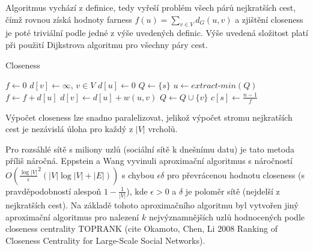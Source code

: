 \documentclass{bakalarka}
\begin{document}
Algoritmus vychází z definice, tedy vyřeší problém všech párů nejkratších cest,
čímž rovnou získá hodnoty farness $f(u) = \sum_{v \in V} d_G(u, v)$ a zjištění
closeness je poté triviální podle jedné z výše uvedených definic.  Výše uvedená
složitost platí při použití Dijkstrova algoritmu pro všechny páry cest.

\begin{center}
\begin{minipage}{\textwidth}
\begin{algorithm}[H]
	\caption{Closeness}
		\label{alg:closeness}

	\begin{algorithmic}[1]
	\Statex
		\State $f \gets 0$
		\State $d[v] \gets \infty$, $v \in V$
		\State $d[u] \gets 0$
		\State $Q \gets \{s\}$
			\State $u \gets extract\mbox{-}min(Q)$
			\State $f \gets f + d[u]$
					\State $d[v] \gets d[u] + w(u, v)$
					\State $Q \gets Q \cup \{v\}$
				\EndIf
			\EndFor
		\EndWhile
		\State $c[s] \gets \frac{n - 1}{f}$
	\EndFor
	\end{algorithmic}
\end{algorithm}
\end{minipage}
\end{center}
\mbox{}

Výpočet closeness lze snadno paralelizovat, jelikož výpočet stromu nejkratších
cest je nezávislá úloha pro každý z $|V|$ vrcholů.

Pro rozsáhlé sítě s miliony uzlů (sociální sítě k dnešnímu datu) je tato metoda
příliš náročná. Eppstein a Wang vyvinuli aproximační algoritmus s náročností
$O(\frac{\log|V|}{\epsilon}^2 (|V| \log |V| + |E|))$ s chybou $\epsilon \delta$
pro převrácenou hodnotu closeness (s pravděpodobností alespoň $1 -
\frac{1}{|V|}$), kde $\epsilon > 0$ a $\delta$ je poloměr sítě (nejdelší z
nejkratších cest). Na základě tohoto aproximačního algoritmu byl vytvořen jiný
aproximační algoritmus pro nalezení $k$ nejvýznamnějších uzlů hodnocených podle
closeness centrality TOPRANK (cite Okamoto, Chen, Li 2008 Ranking of Closeness
Centrality for Large-Scale Social Networks).
\end{document}
